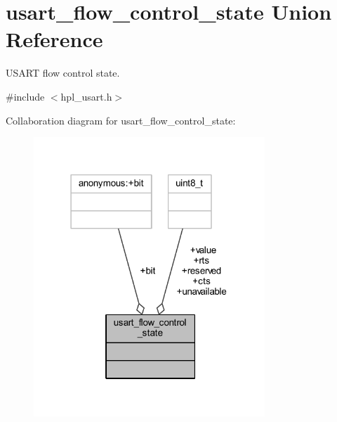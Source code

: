 \hypertarget{unionusart__flow__control__state}{}\section{usart\+\_\+flow\+\_\+control\+\_\+state Union Reference}
\label{unionusart__flow__control__state}


U\+S\+A\+RT flow control state.  




{\ttfamily \#include $<$hpl\+\_\+usart.\+h$>$}



Collaboration diagram for usart\+\_\+flow\+\_\+control\+\_\+state\+:\nopagebreak
\begin{figure}[H]
\begin{center}
\leavevmode
\includegraphics[width=247pt]{unionusart__flow__control__state__coll__graph}
\end{center}
\end{figure}
